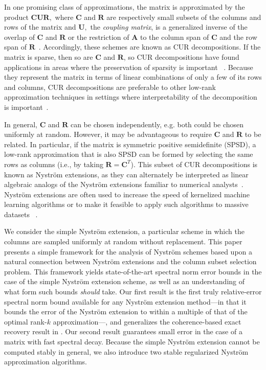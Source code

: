 \documentclass[11pt,letterpaper,twoside,reqno,nosumlimits]{amsart}
\def\transp{T}
\newcommand{\mat}[1]{\ensuremath{\mathbf{#1}}}
\theoremstyle{remark}
\begin{document}
In one promising class of approximations, the matrix is approximated by the product $\mat{C}\mat{U}\mat{R},$ where $\mat{C}$ and $\mat{R}$ are respectively small subsets of the columns and rows of the matrix and $\mat{U},$ the \emph{coupling matrix}, is a generalized inverse of the overlap of $\mat{C}$ and $\mat{R}$ or the restriction of $\mat{A}$ to the column span of $\mat{C}$ and the row span of $\mat{R}$~\cite{DKM06}. Accordingly, these schemes are known as CUR decompositions. If the matrix is sparse, then so are $\mat{C}$ and $\mat{R}$, so CUR decompositions have found applications in areas where the preservation of sparsity is important ~\cite{SXZF07}. Because they represent the matrix in terms of linear combinations of only a few of its rows and columns, CUR decompositions are preferable to other low-rank approximation techniques in settings where interpretability of the decomposition is important~\cite{DM09CUR,HMT08}.

In general, $\mat{C}$ and $\mat{R}$ can be chosen independently, e.g. both could be chosen uniformly at random. However, it may be advantageous to require $\mat{C}$ and $\mat{R}$ to be related. In particular, if the matrix is symmetric positive semidefinite (SPSD), a low-rank approximation that is also SPSD can be formed by selecting the same rows as columns (i.e., by taking $\mat{R} = \mat{C}^\transp$). This subset of CUR decompositions is known as Nystr\"om extensions, as they can alternately be interpreted as linear algebraic analogs of the Nystr\"om extensions familiar to numerical analysts~\cite{SW01}. Nystr\"om extensions are often used to increase the speed of kernelized machine learning algorithms or to make it feasible to apply such algorithms to massive datasets ~\cite{CMT10,SW01,BCFM04,TKR08,KPSH07}.  


We consider the simple Nystr\"om extension, a particular scheme in which the columns are sampled uniformly at random without replacement. This paper presents a simple framework for the analysis of Nystr\"om schemes based upon a natural connection between Nystr\"om extensions and the column subset selection problem. This framework yields state-of-the-art spectral norm error bounds in the case of the simple Nystr\"om extension scheme, as well as an understanding of what form such bounds \emph{should} take. Our first result is the first truly relative-error spectral norm bound available for any Nystr\"om extension method---in that it bounds the error of the Nystr\"om extension to within a multiple of that of the optimal rank-$k$ approximation---, and generalizes the coherence-based exact recovery result in \cite{TR10}. Our second result guarantees small error in the case of a matrix with fast spectral decay. Because the simple Nystr\"om extension cannot be computed stably in general, we also introduce two 
stable regularized Nystr\"om approximation algorithms.
\end{document}
